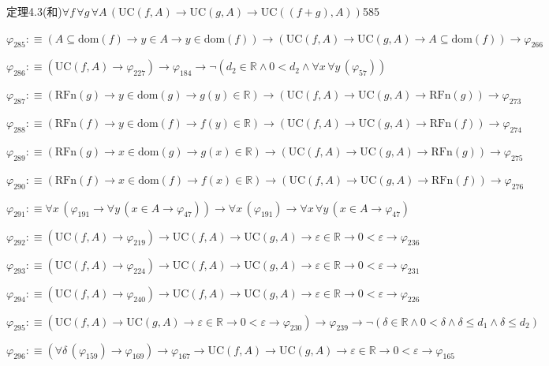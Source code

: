 \begin{fullproof}{定理4.3(和)}{$\forall f\,\forall g\,\forall A\,(\mathrm{UC}(f,A) \to \mathrm{UC}(g,A) \to \mathrm{UC}((f + g),A))$}{585}
\begin{abbrevlist}
\item $\varphi_{285} :\equiv (A \subseteq \mathrm{dom}(f) \to y \in A \to y \in \mathrm{dom}(f)) \to (\mathrm{UC}(f,A) \to \mathrm{UC}(g,A) \to A \subseteq \mathrm{dom}(f)) \to \varphi_{266}$
\item $\varphi_{286} :\equiv (\mathrm{UC}(f,A) \to \varphi_{227}) \to \varphi_{184} \to \neg (d_{2} \in \mathbb{R} \land 0 < d_{2} \land \forall x\,\forall y\,(\varphi_{57}))$
\item $\varphi_{287} :\equiv (\mathrm{RFn}(g) \to y \in \mathrm{dom}(g) \to g(y) \in \mathbb{R}) \to (\mathrm{UC}(f,A) \to \mathrm{UC}(g,A) \to \mathrm{RFn}(g)) \to \varphi_{273}$
\item $\varphi_{288} :\equiv (\mathrm{RFn}(f) \to y \in \mathrm{dom}(f) \to f(y) \in \mathbb{R}) \to (\mathrm{UC}(f,A) \to \mathrm{UC}(g,A) \to \mathrm{RFn}(f)) \to \varphi_{274}$
\item $\varphi_{289} :\equiv (\mathrm{RFn}(g) \to x \in \mathrm{dom}(g) \to g(x) \in \mathbb{R}) \to (\mathrm{UC}(f,A) \to \mathrm{UC}(g,A) \to \mathrm{RFn}(g)) \to \varphi_{275}$
\item $\varphi_{290} :\equiv (\mathrm{RFn}(f) \to x \in \mathrm{dom}(f) \to f(x) \in \mathbb{R}) \to (\mathrm{UC}(f,A) \to \mathrm{UC}(g,A) \to \mathrm{RFn}(f)) \to \varphi_{276}$
\item $\varphi_{291} :\equiv \forall x\,(\varphi_{191} \to \forall y\,(x \in A \to \varphi_{47})) \to \forall x\,(\varphi_{191}) \to \forall x\,\forall y\,(x \in A \to \varphi_{47})$
\item $\varphi_{292} :\equiv (\mathrm{UC}(f,A) \to \varphi_{219}) \to \mathrm{UC}(f,A) \to \mathrm{UC}(g,A) \to \varepsilon \in \mathbb{R} \to 0 < \varepsilon \to \varphi_{236}$
\item $\varphi_{293} :\equiv (\mathrm{UC}(f,A) \to \varphi_{224}) \to \mathrm{UC}(f,A) \to \mathrm{UC}(g,A) \to \varepsilon \in \mathbb{R} \to 0 < \varepsilon \to \varphi_{231}$
\item $\varphi_{294} :\equiv (\mathrm{UC}(f,A) \to \varphi_{240}) \to \mathrm{UC}(f,A) \to \mathrm{UC}(g,A) \to \varepsilon \in \mathbb{R} \to 0 < \varepsilon \to \varphi_{226}$
\item $\varphi_{295} :\equiv (\mathrm{UC}(f,A) \to \mathrm{UC}(g,A) \to \varepsilon \in \mathbb{R} \to 0 < \varepsilon \to \varphi_{230}) \to \varphi_{239} \to \neg (\delta \in \mathbb{R} \land 0 < \delta \land \delta \leq d_{1} \land \delta \leq d_{2})$
\item $\varphi_{296} :\equiv (\forall \delta\,(\varphi_{159}) \to \varphi_{169}) \to \varphi_{167} \to \mathrm{UC}(f,A) \to \mathrm{UC}(g,A) \to \varepsilon \in \mathbb{R} \to 0 < \varepsilon \to \varphi_{165}$

\end{abbrevlist}
\end{fullproof}
